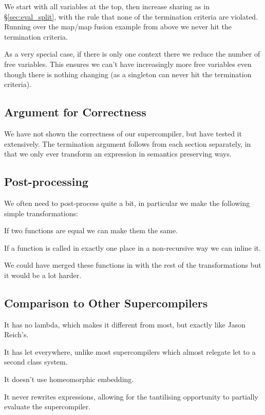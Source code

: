 \documentclass[draft]{sigplanconf}
\begin{document}
\begin{code}
We start with all variables at the top, then increase sharing as in \S\ref{sec:eval_split}, with the rule that none of the termination criteria are violated. Running over the map/map fusion example from above we never hit the termination criteria.

As a very special case, if there is only one context there we reduce the number of free variables. This ensures we can't have increasingly more free variables even though there is nothing changing (as a singleton can never hit the termination criteria).

\subsection{Argument for Correctness}

We have not shown the correctness of our supercompiler, but have tested it extensively. The termination argument follows from each section separately, in that we only ever transform an expression in semantics preserving ways.

\subsection{Post-processing}
\label{sec:postprocess}

We often need to post-process quite a bit, in particular we make the following simple transformations:

If two functions are equal we can make them the same.

If a function is called in exactly one place in a non-recursive way we can inline it.

We could have merged these functions in with the rest of the transformations but it would be a lot harder.

\subsection{Comparison to Other Supercompilers}
\label{sec:comparison}

It has no lambda, which makes it different from most, but exactly like Jason Reich's.

It has let everywhere, unlike most supercompilers which almost relegate let to a second class system.

It doesn't use homeomorphic embedding.

It never rewrites expressions, allowing for the tantilising opportunity to partially evaluate the supercompiler.


\end{code}
\end{document}
